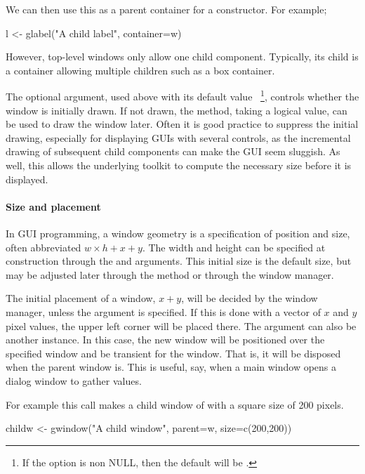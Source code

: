 We can then use this as a parent container for a constructor. For example;
\begin{Schunk}
\begin{Sinput}
 l <- glabel("A child label", container=w)
\end{Sinput}
\end{Schunk}
%
However, top-level windows only allow one child component. Typically, its child
is a container allowing multiple children such as a box container.


The optional  argument, used above with its
default value ~\footnote{If the option
 is non NULL, then the
default will be .}, controls whether the
window is initially drawn. If not drawn, the
 method, taking a logical value, can
be used to draw the window later.  Often it is good practice to suppress
the initial drawing, especially for displaying GUIs with several
controls, as the incremental drawing of subsequent child components can
make the GUI seem sluggish. As well, this allows the underlying
toolkit to compute the necessary size before it is displayed.


\paragraph{Size and placement}
In GUI programming, a window geometry is a specification of position
and size, often abbreviated $w \times h + x + y$. The width and height
can be specified at construction through the 
and  arguments. This initial size is the
default size, but may be adjusted later through the
 method or through the window manager. 

The initial placement of a window, $x+y$, will be decided by the
window manager, unless the  argument is
specified. If this is done with a vector of $x$ and $y$ pixel values,
the upper left corner will be placed there. The  argument
can also be another  instance. In this case, the new
window will be positioned over the specified window and be transient
for the window. That is, it will be disposed when the parent window
is. This is useful, say, when a main window opens a dialog window to
gather values.

For example this call makes a child window of  with a square
size of 200 pixels.
\begin{Schunk}
\begin{Sinput}
 childw <- gwindow("A child window", parent=w, size=c(200,200))
\end{Sinput}
\end{Schunk}


